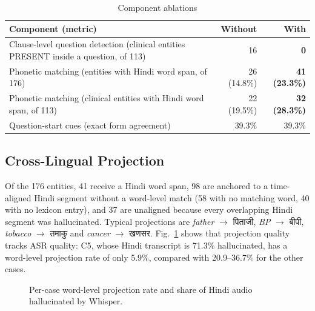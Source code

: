 \documentclass[conference]{IEEEtran}
\begin{document}
\begin{table}[!t]
\centering\footnotesize
\caption{Component ablations}\label{tab:abl}
\begin{tabularx}{\columnwidth}{>{\raggedright\arraybackslash}Xrr}
\toprule
\textbf{Component (metric)} & \textbf{Without} & \textbf{With} \\
\midrule
Clause-level question detection (clinical entities PRESENT inside a question, of 113) & 16 & \textbf{0} \\
Phonetic matching (entities with Hindi word span, of 176) & 26 (14.8\%) & \textbf{41 (23.3\%)} \\
Phonetic matching (clinical entities with Hindi word span, of 113) & 22 (19.5\%) & \textbf{32 (28.3\%)} \\
Question-start cues (exact form agreement) & 39.3\% & 39.3\% \\
\bottomrule
\end{tabularx}
\end{table}

\subsection{Cross-Lingual Projection}
Of the 176 entities, 41 receive a Hindi word span, 98 are anchored to a time-aligned Hindi segment without a word-level match (58 with no matching word, 40 with no lexicon entry), and 37 are unaligned because every overlapping Hindi segment was hallucinated. Typical projections are \emph{father} $\rightarrow$ {\dev पिताजी}, \emph{BP} $\rightarrow$ {\dev बीपी}, \emph{tobacco} $\rightarrow$ {\dev तमाकु} and \emph{cancer} $\rightarrow$ {\dev खणसर}. Fig.~\ref{fig:align} shows that projection quality tracks ASR quality: C5, whose Hindi transcript is 71.3\% hallucinated, has a word-level projection rate of only 5.9\%, compared with 20.9–36.7\% for the other cases.

\begin{figure}[!t]
\centering
{}
\caption{Per-case word-level projection rate and share of Hindi audio hallucinated by Whisper.}\label{fig:align}
\end{figure}
\end{document}
